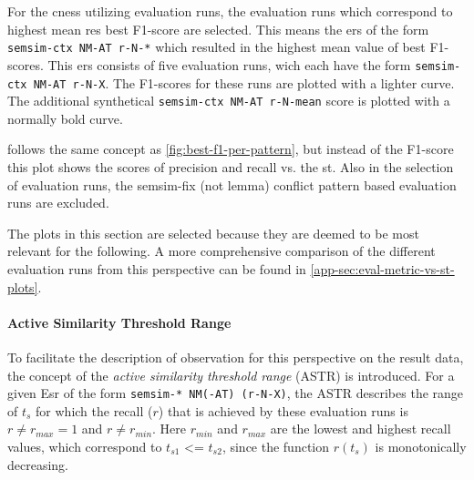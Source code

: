 \documentclass[11pt]{scrreprt}
\begin{document}
{For the \gls{cness} utilizing evaluation runs, the evaluation runs which correspond to highest mean \gls{res} best F1-score are selected. This means the \gls{ers} of the form \texttt{semsim-ctx NM-AT r-N-*} which resulted in the highest mean value of best F1-scores. This \gls{ers} consists of five evaluation runs, wich each have the form \texttt{semsim-ctx NM-AT r-N-X}. The F1-scores for these runs are plotted with a lighter curve. The additional synthetical \texttt{semsim-ctx NM-AT r-N-mean} score is plotted with a normally bold curve. 


 follows the same concept as \cref{fig:best-f1-per-pattern}, but instead of the F1-score this plot shows the scores of precision and recall vs. the \gls{st}. Also in the selection of evaluation runs, the semsim-fix (not lemma) conflict pattern based evaluation runs are excluded.

The plots in this section are selected because they are deemed to be most relevant for the following. A more comprehensive comparison of the different evaluation runs from this perspective can be found in \cref{app-sec:eval-metric-vs-st-plots}.


\paragraph{Active Similarity Threshold Range}
To facilitate the description of observation for this perspective on the result data, the concept of the \textit{active similarity threshold range} (ASTR) is introduced. For a given E\gls{sr} of the form \texttt{semsim-* NM(-AT) (r-N-X)}, the ASTR describes the range of \(t_s\) for which the recall (\(r\)) that is achieved by these evaluation runs is \(r \neq r_{max} = 1 \) and \(r \neq r_{min}\). Here \(r_{min}\) and \(r_{max}\) are the lowest and highest recall values, which correspond to \(t_{s1}\) <= \(t_{s2}\), since the function \(r(t_s)\) is monotonically decreasing.

}
\end{document}
